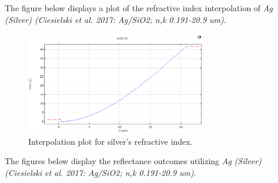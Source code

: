 The figure below displays a plot of the refractive index interpolation of \emph{Ag (Silver) (Ciesielski et al. 2017: Ag/SiO2; n,k 0.191-20.9 um)}.

\begin{figure}[H]
  \centering
  \includegraphics[width=0.7\textwidth]{Chapters/Figures/Chapter 4 Figures/Interpolation Plot (Silver).png}
  \caption{Interpolation plot for silver's refractive index.}
  \label{fig:Interpolation plot for silver's refractive index}
\end{figure}

The figures below display the reflectance outcomes utilizing \emph{Ag (Silver) (Ciesielski et al. 2017: Ag/SiO2; n,k 0.191-20.9 um)}.

